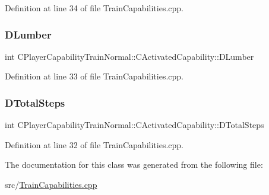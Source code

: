 Definition at line 34 of file Train\+Capabilities.\+cpp.

\hypertarget{classCPlayerCapabilityTrainNormal_1_1CActivatedCapability_a49a77c92b6146819efb1a7a8b6fb8972}{}\label{classCPlayerCapabilityTrainNormal_1_1CActivatedCapability_a49a77c92b6146819efb1a7a8b6fb8972} 
\subsubsection{\texorpdfstring{D\+Lumber}{DLumber}}
{\footnotesize\ttfamily int C\+Player\+Capability\+Train\+Normal\+::\+C\+Activated\+Capability\+::\+D\+Lumber\hspace{0.3cm}{\ttfamily [protected]}}



Definition at line 33 of file Train\+Capabilities.\+cpp.

\hypertarget{classCPlayerCapabilityTrainNormal_1_1CActivatedCapability_a2bee6a6395fd7cc0fcf4001bbbadb165}{}\label{classCPlayerCapabilityTrainNormal_1_1CActivatedCapability_a2bee6a6395fd7cc0fcf4001bbbadb165} 
\subsubsection{\texorpdfstring{D\+Total\+Steps}{DTotalSteps}}
{\footnotesize\ttfamily int C\+Player\+Capability\+Train\+Normal\+::\+C\+Activated\+Capability\+::\+D\+Total\+Steps\hspace{0.3cm}{\ttfamily [protected]}}



Definition at line 32 of file Train\+Capabilities.\+cpp.



The documentation for this class was generated from the following file\+:\begin{DoxyCompactItemize}
\item 
src/\hyperlink{TrainCapabilities_8cpp}{Train\+Capabilities.\+cpp}\end{DoxyCompactItemize}
